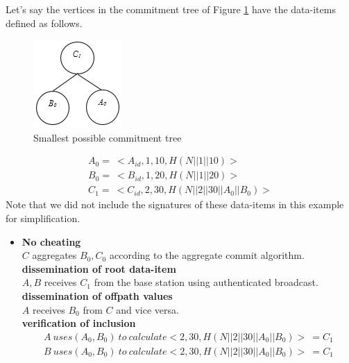 \begin{exmp}
	\label{ex1:cheating}
	Let's say the vertices in the commitment tree of Figure \ref{fig:cheating} have the data-items defined as follows.
	\begin{figure}[t]
		\centering
		\includegraphics{images/commitment-tree-2.png}
		\caption{Smallest possible commitment tree}
		\label{fig:cheating}
	\end{figure}
	\begin{equation}
		\begin{array}{l}
			A_{0} =\ <A_{id},1,10, H(N||1||10)>\\
			B_{0} =\ <B_{id},1,20, H(N||1||20)>\\
			C_{1} =\ <C_{id},2,30, H(N||2||30||A_{0}||B_{0})>
		\end{array}
	\end{equation}
	Note that we did not include the signatures of these data-items in this example for simplification.
	\begin{itemize}
	\item \textbf{No cheating}\\
		$C$ aggregates $B_{0},C_{0}$ according to the aggregate commit algorithm.\\
		\textbf{dissemination of root data-item}\\
			$A,B$ receives $C_{1}$ from the base station using authenticated broadcast.\\
		\textbf{dissemination of offpath values}\\
			$A$ receives $B_{0}$ from $C$ and vice versa.\\
		\textbf{verification of inclusion}
			\begin{equation}
				\begin{array}{l}
					A\ uses (A_{0}, B_{0})\ to\ calculate <2,30,H(N||2||30||A_{0}||B_{0})>\ = C_{1}\\
					B\ uses (A_{0}, B_{0})\ to\ calculate <2,30,H(N||2||30||A_{0}||B_{0})>\ = C_{1}

\end{array}
\end{equation}
\end{itemize}
\end{exmp}
